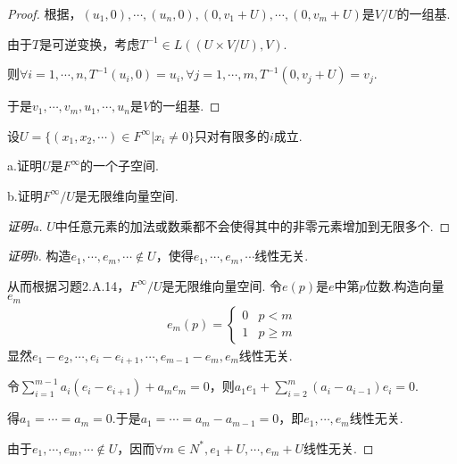 \begin{proof}
    根据，\((u_1,0),\cdots,(u_n,0),(0,v_1+U),\cdots,(0,v_m+U)\)是\(V/U\)的一组基.

    由于\(T\)是可逆变换，考虑\(T^{-1} \in L((U \times V/U),V)\).

    则\(\forall i=1,\cdots,n,T^{-1}(u_i,0)=u_i,\forall j=1,\cdots,m,T^{-1}(0,v_j+U)=v_j\).

    于是\(v_1,\cdots,v_m,u_1,\cdots,u_n\)是\(V\)的一组基.
\end{proof}

\newpage

\begin{problem}[14]\label{3.E.14}
    设\(U=\{(x_1,x_2,\cdots)\in F^\infty | x_i \ne 0\}\)只对有限多的\(i\)成立.

    a.证明\(U\)是\(F^\infty\)的一个子空间.

    b.证明\(F^\infty /U\)是无限维向量空间.
\end{problem}

\begin{proof}[证明a]
    \(U\)中任意元素的加法或数乘都不会使得其中的非零元素增加到无限多个.
\end{proof}

\begin{proof}[证明b]
    构造\(e_1,\cdots,e_m,\cdots \notin U\)，使得\(e_1,\cdots,e_m,\cdots\)线性无关.

    从而根据习题2.A.14，\(F^\infty /U\)是无限维向量空间.%
    令\(e(p)\)是\(e\)中第\(p\)位数.构造向量\(e_m\)
    \begin{align*}
        e_m(p)=
            \begin{cases}
                0 & p<m \\
                1 & p \geq m
            \end{cases}
    \end{align*}
    显然\(e_1-e_2,\cdots,e_i-e_{i+1},\cdots,e_{m-1}-e_m,e_m\)线性无关.
    
    令\(\sum_{i=1}^{m-1} a_i(e_i-e_{i+1})+a_me_m=0\)，则\(a_1e_1+\sum_{i=2}^m(a_i-a_{i-1})e_i=0\).
    
    得\(a_1=\cdots=a_m=0\).于是\(a_1=\cdots=a_m-a_{m-1}=0\)，即\(e_1,\cdots,e_m\)线性无关.
    
    由于\(e_1,\cdots,e_m,\cdots \notin U\)，因而\(\forall m \in N^*,e_1+U,\cdots,e_m+U\)线性无关.
\end{proof}

